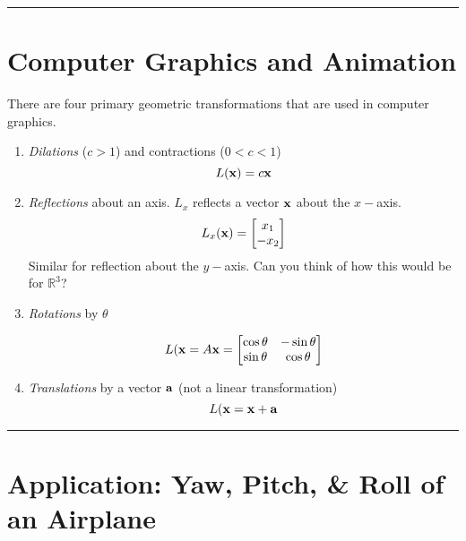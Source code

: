 \rule[0.01in]{\textwidth}{0.0025in}




\section*{Computer Graphics and Animation}

There are four primary geometric transformations that are used in computer graphics.
\begin{enumerate}
	\item \textit{Dilations} ($c >1$) and contractions ($ 0 < c <1 $)
	\[  L({\bf x}) = c {\bf x} \] 
	
	\item \textit{Reflections} about an axis.  $L_x$ reflects a vector ${\bf x}$ about the $x-$axis.  
	\[  L_x({\bf x}) =  \begin{bmatrix} x_1 \\ - x_2 \end{bmatrix} \] 
	Similar for reflection about the $y-$axis.  Can you think of how this would be for $\mathbb{R}^3$?
	
	\item \textit{Rotations} by $\theta$
	
	\[  L({\bf x} = A {\bf x} = \begin{bmatrix} \cos \theta  & -\sin \theta \\  \sin \theta & \cos \theta   \end{bmatrix} \]
	
	
	\item \textit{Translations} by a vector ${\bf a}$ (not a linear transformation)
	\[  L({\bf x} = {\bf x} + {\bf a}  \]
	
\end{enumerate}







\rule[0.01in]{\textwidth}{0.0025in}









\section*{Application: Yaw, Pitch, \& Roll of an Airplane}

